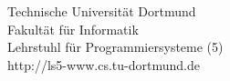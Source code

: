 \begin{titlepage}
\vspace*{2.5cm}
\hspace*{\links}
\begin{minipage}[b]{8cm}
\raggedright
Technische Universität Dortmund \\
Fakultät für Informatik\\
Lehrstuhl für Programmiersysteme (5)\\
http://ls5-www.cs.tu-dortmund.de
\end{minipage}

\end{titlepage}
